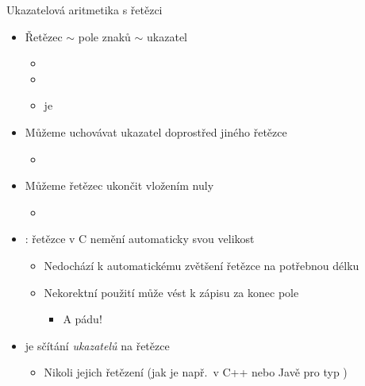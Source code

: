 \begin{frame}{Ukazatelová aritmetika s řetězci}

  \begin{itemize}
    \item Řetězec $\sim$ pole znaků $\sim$ ukazatel
    \begin{itemize}
      \item {}
      \item {}
      \item {} je 
    \end{itemize}

    \pause

    \item Můžeme uchovávat ukazatel doprostřed jiného řetězce
    \begin{itemize}
      \item {}
    \end{itemize}

    \pause

    \item Můžeme řetězec ukončit vložením nuly
    \begin{itemize}
      \item {}
    \end{itemize}

    \pause

    \item \pozor: řetězce v C nemění automaticky svou velikost
    \begin{itemize}
      \item Nedochází k automatickému zvětšení řetězce na potřebnou délku
      \item Nekorektní použití může vést k zápisu za konec pole
      \begin{itemize}
	\item A pádu!
      \end{itemize}
    \end{itemize}

    \pause

    \item {} je sčítání \emph{ukazatelů} na řetězce
    \begin{itemize}
      \item Nikoli jejich řetězení (jak je např.\ v C++ nebo Javě pro typ
	)
    \end{itemize}

  \end{itemize}

\end{frame}

